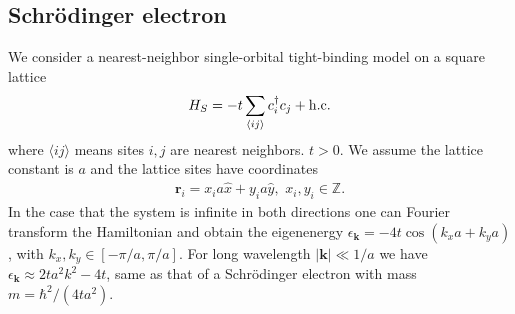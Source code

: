 \documentclass[11pt,letterpaper]{article}
\begin{document}
\subsection{Schr\"{o}dinger electron}
We consider a nearest-neighbor single-orbital tight-binding model on a square lattice
\begin{eqnarray}
H_S = -t \sum_{\langle ij \rangle} c_{i}^\dag c_j + {\rm h.c.} 
\end{eqnarray}
where $\langle ij \rangle$ means sites $i, j$ are nearest neighbors. $t > 0$. We assume the lattice constant is $a$ and the lattice sites have coordinates
\begin{eqnarray}
\bm r_{i} = x_i a \hat{x} + y_i a \hat{y},\,\, x_i, y_i \in \mathbb{Z}.
\end{eqnarray} 
In the case that the system is infinite in both directions one can Fourier transform the Hamiltonian and obtain the eigenenergy $\epsilon_{\bm k} = -4t\cos(k_x a + k_y a)$, with $k_x, k_y \in [-\pi/a, \pi/a]$. For long wavelength $|\bm k|\ll 1/a$ we have $\epsilon_{\bm k} \approx 2ta^2 k^2 -4t$, same as that of a Schr\"{o}dinger electron with mass $m = \hbar^2/(4ta^2)$.
\end{document}

